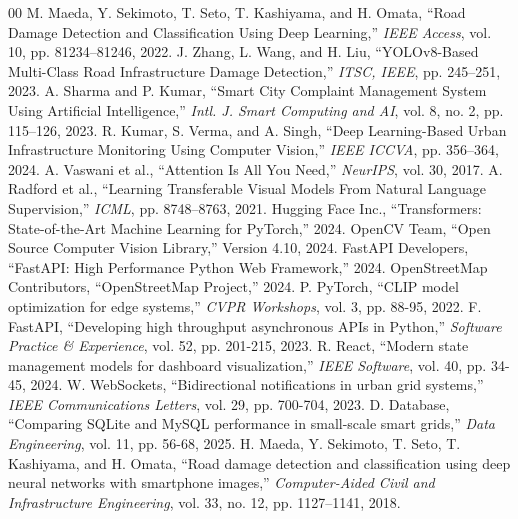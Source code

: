 \documentclass[journal]{IEEEtran}
\begin{document}
\begin{thebibliography}{00}
 M. Maeda, Y. Sekimoto, T. Seto, T. Kashiyama, and H. Omata, ``Road Damage Detection and Classification Using Deep Learning,'' \textit{IEEE Access}, vol. 10, pp. 81234--81246, 2022.
 J. Zhang, L. Wang, and H. Liu, ``YOLOv8-Based Multi-Class Road Infrastructure Damage Detection,'' \textit{ITSC, IEEE}, pp. 245--251, 2023.
 A. Sharma and P. Kumar, ``Smart City Complaint Management System Using Artificial Intelligence,'' \textit{Intl. J. Smart Computing and AI}, vol. 8, no. 2, pp. 115--126, 2023.
 R. Kumar, S. Verma, and A. Singh, ``Deep Learning-Based Urban Infrastructure Monitoring Using Computer Vision,'' \textit{IEEE ICCVA}, pp. 356--364, 2024.
 A. Vaswani et al., ``Attention Is All You Need,'' \textit{NeurIPS}, vol. 30, 2017.
 A. Radford et al., ``Learning Transferable Visual Models From Natural Language Supervision,'' \textit{ICML}, pp. 8748--8763, 2021.
 Hugging Face Inc., ``Transformers: State-of-the-Art Machine Learning for PyTorch,'' 2024.
 OpenCV Team, ``Open Source Computer Vision Library,'' Version 4.10, 2024.
 FastAPI Developers, ``FastAPI: High Performance Python Web Framework,'' 2024.
 OpenStreetMap Contributors, ``OpenStreetMap Project,'' 2024.
 P. PyTorch, ``CLIP model optimization for edge systems,'' \textit{CVPR Workshops}, vol. 3, pp. 88-95, 2022.
 F. FastAPI, ``Developing high throughput asynchronous APIs in Python,'' \textit{Software Practice \& Experience}, vol. 52, pp. 201-215, 2023.
 R. React, ``Modern state management models for dashboard visualization,'' \textit{IEEE Software}, vol. 40, pp. 34-45, 2024.
 W. WebSockets, ``Bidirectional notifications in urban grid systems,'' \textit{IEEE Communications Letters}, vol. 29, pp. 700-704, 2023.
 D. Database, ``Comparing SQLite and MySQL performance in small-scale smart grids,'' \textit{Data Engineering}, vol. 11, pp. 56-68, 2025.
 H. Maeda, Y. Sekimoto, T. Seto, T. Kashiyama, and H. Omata, ``Road damage detection and classification using deep neural networks with smartphone images,'' \textit{Computer-Aided Civil and Infrastructure Engineering}, vol. 33, no. 12, pp. 1127--1141, 2018.
\end{thebibliography}
\end{document}
